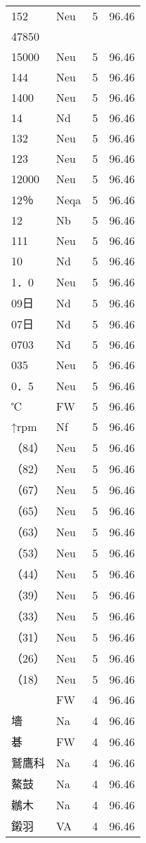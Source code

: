 \documentclass[twocolumn]{book}
\begin{document}
\begin{supertabular}{llrr}
152 & Neu & 5 &  96.46\\
47850\\
15000 & Neu & 5 &  96.46\\
144 & Neu & 5 &  96.46\\
1400 & Neu & 5 &  96.46\\
14 & Nd & 5 &  96.46\\
132 & Neu & 5 &  96.46\\
123 & Neu & 5 &  96.46\\
12000 & Neu & 5 &  96.46\\
12％ & Neqa & 5 &  96.46\\
12 & Nb & 5 &  96.46\\
111 & Neu & 5 &  96.46\\
10 & Nd & 5 &  96.46\\
1．0 & Neu & 5 &  96.46\\
09日 & Nd & 5 &  96.46\\
07日 & Nd & 5 &  96.46\\
0703 & Nd & 5 &  96.46\\
035 & Neu & 5 &  96.46\\
0．5 & Neu & 5 &  96.46\\
℃ & FW & 5 &  96.46\\
↑rpm & Nf & 5 &  96.46\\
（84） & Neu & 5 &  96.46\\
（82） & Neu & 5 &  96.46\\
（67） & Neu & 5 &  96.46\\
（65） & Neu & 5 &  96.46\\
（63） & Neu & 5 &  96.46\\
（53） & Neu & 5 &  96.46\\
（44） & Neu & 5 &  96.46\\
（39） & Neu & 5 &  96.46\\
（33） & Neu & 5 &  96.46\\
（31） & Neu & 5 &  96.46\\
（26） & Neu & 5 &  96.46\\
（18） & Neu & 5 &  96.46\\
 & FW & 4 &  96.46\\
墻 & Na & 4 &  96.46\\
碁 & FW & 4 &  96.46\\
鷲鷹科 & Na & 4 &  96.46\\
鰲鼓 & Na & 4 &  96.46\\
鶒木 & Na & 4 &  96.46\\
鎩羽 & VA & 4 &  96.46\\

\end{supertabular}
\end{document}
